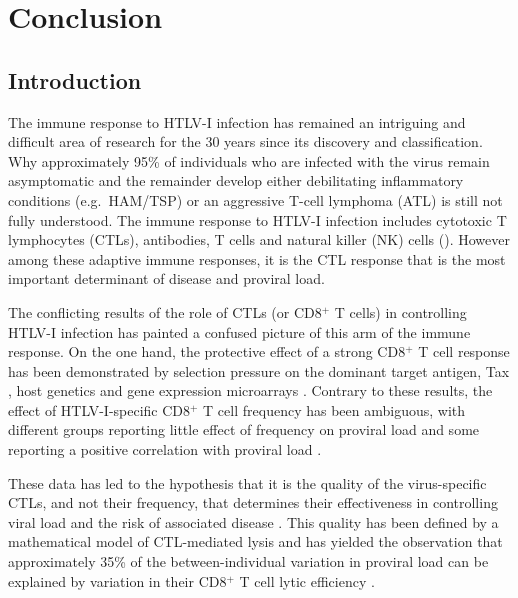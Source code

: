 
\chapter{Conclusion} %
\label{Chapter8}

\section{Introduction}

The immune response to HTLV-I infection has remained an intriguing and difficult area of research for the 30 years since its discovery and classification. Why approximately 95\% of individuals who are infected with the virus remain asymptomatic and the remainder develop either debilitating inflammatory conditions (e.g.~HAM/TSP) or an aggressive T-cell lymphoma (ATL) is still not fully understood. The immune response to HTLV-I infection includes cytotoxic T lymphocytes (CTLs), antibodies, T cells and natural killer (NK) cells (). However among these adaptive immune responses, it is the CTL response that is the most important determinant of disease and proviral load.

The conflicting results of the role of CTLs (or CD8$^+$ T cells) in controlling HTLV-I infection has painted a confused picture of this arm of the immune response. On the one hand, the protective effect of a strong CD8$^+$ T cell response has been demonstrated by selection pressure on the dominant target antigen, Tax \citep{Niewiesk1994, Kubota2007}, host genetics \citep{Jeffery1999, Jeffery2000, Vine2002} and gene expression microarrays \citep{Vine2004}. Contrary to these results, the effect of HTLV-I-specific CD8$^+$ T cell frequency has been ambiguous, with different groups reporting little effect of frequency on proviral load \citep{Parker1992, Parker1994} and some reporting a positive correlation with proviral load \citep{Kubota2000, Wodarz2001}.

These data has led to the hypothesis that it is the quality of the virus-specific CTLs, and not their frequency, that determines their effectiveness in controlling viral load and the risk of associated disease \citep{Nowak1996}. This quality has been defined by a mathematical model of CTL-mediated lysis \citep{Asquith2005a} and has yielded the observation that approximately 35\% of the between-individual variation in proviral load can be explained by variation in their CD8$^+$ T cell lytic efficiency \citep{Asquith2005a, Kattan2009}.

